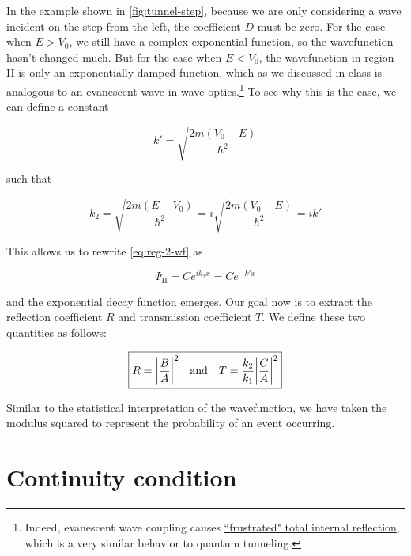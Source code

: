 In the example shown in \autoref{fig:tunnel-step}, because we are only considering a wave incident on the step from the left, the coefficient $D$ must be zero. 
For the case when $E > V_0$, we still have a complex exponential function, so the wavefunction hasn't changed much. 
But for the case when $E < V_0$, the wavefunction in region II is only an exponentially damped function, which as we discussed in class is analogous to an evanescent wave in wave optics.\footnote{Indeed, evanescent wave coupling causes \href{https://en.wikipedia.org/wiki/Total_internal_reflection\#Frustrated_total_internal_reflection}{``frustrated" total internal reflection}, which is a very similar behavior to quantum tunneling.} 
To see why this is the case, we can define a constant

\begin{equation}
	k' = \sqrt{\frac{2m(V_0-E)}{\hbar^2}} \label{eq:reg-2-kp}
\end{equation}

\noindent such that

\begin{equation*}
	k_2 = \sqrt{\frac{2m(E-V_0)}{\hbar^2}} = i\sqrt{\frac{2m(V_0-E)}{\hbar^2}} = ik'
\end{equation*}

This allows us to rewrite \autoref{eq:reg-2-wf} as 

\begin{equation}
	\Psi_{\text{II}} = Ce^{ik_2x} = Ce^{-k'x} \label{eq:reg-2-wfp}
\end{equation}

\noindent and the exponential decay function emerges. 
Our goal now is to extract the reflection coefficient $R$ and transmission coefficient $T$. 
We define these two quantities as follows:

\begin{equation*}
	\boxed{R = \abs{\frac{B}{A}}^2 \quad \text{and} \quad T = \frac{k_2}{k_1}\abs{\frac{C}{A}}^2}
\end{equation*}

Similar to the statistical interpretation of the wavefunction, we have taken the modulus squared to represent the probability of an event occurring.


\section{Continuity condition}

